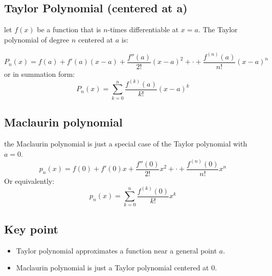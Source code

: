 \documentclass{article}
\begin{document}
                                \subsection{Taylor Polynomial (centered at a)}
                                    let \(f(x)\) be a function that is \(n\)-times differentiable at \(x = a\). 
                                    The Taylor polynomial of degree \(n\) centered at \(a\) is: 

                                        \[P_n(x) = f(a) + f'(a)(x - a) + \frac{f''(a)}{2!}{(x - a)}^{2} + \cdot + \frac{f^{(n)}(a)}{n!}{(x - a)}^{n}\]
                                    or in summation form: 
                                        \[P_n(x) = \sum_{k = 0}^{n} \frac{f^{(k)}(a)}{k!}{(x - a)}^k\]
                                
                                 \subsection{Maclaurin polynomial}
                                     the Maclaurin polynomial is just a special case of the Taylor polynomial with \(a = 0\).
                                        \[p_n(x) = f(0) + f'(0)x + \frac{f''(0)}{2!}x^2 + \cdot + \frac{f^{(n)}(0)}{n!} x^n\]
                                    Or equivalently: 
                                        \[p_n(x) = \sum_{k = 0}^{n} \frac{f^{(k)}(0)}{k!} x^k\]
                                 \subsection{Key point}
                                    \begin{itemize}
                                        \item Taylor polynomial approximates a function near a general point \(a\). 
                                        \item Maclaurin polynomial is just a Taylor polynomial centered at 0.
                                    \end{itemize}
\end{document}
